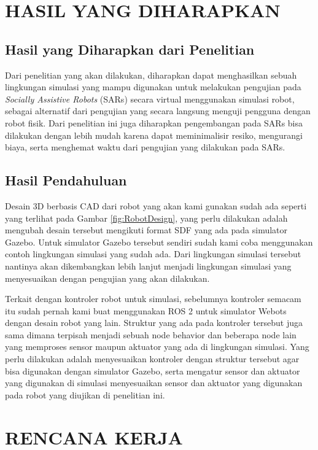 \section{HASIL YANG DIHARAPKAN}

\subsection{Hasil yang Diharapkan dari Penelitian}

Dari penelitian yang akan dilakukan, diharapkan dapat menghasilkan sebuah lingkungan simulasi yang mampu digunakan untuk melakukan pengujian pada \emph{Socially Assistive Robots} (SARs) secara virtual menggunakan simulasi robot, sebagai alternatif dari pengujian yang secara langsung menguji pengguna dengan robot fisik.
Dari penelitian ini juga diharapkan pengembangan pada SARs bisa dilakukan dengan lebih mudah karena dapat meminimalisir resiko, mengurangi biaya, serta menghemat waktu dari pengujian yang dilakukan pada SARs.

\subsection{Hasil Pendahuluan}

Desain 3D berbasis CAD dari robot yang akan kami gunakan sudah ada seperti yang terlihat pada Gambar \ref{fig:RobotDesign}, yang perlu dilakukan adalah mengubah desain tersebut mengikuti format SDF yang ada pada simulator Gazebo.
Untuk simulator Gazebo tersebut sendiri sudah kami coba menggunakan contoh lingkungan simulasi yang sudah ada.
Dari lingkungan simulasi tersebut nantinya akan dikembangkan lebih lanjut menjadi lingkungan simulasi yang menyesuaikan dengan pengujian yang akan dilakukan.

Terkait dengan kontroler robot untuk simulasi, sebelumnya kontroler semacam itu sudah pernah kami buat menggunakan ROS 2 untuk simulator Webots dengan desain robot yang lain.
Struktur yang ada pada kontroler tersebut juga sama dimana terpisah menjadi sebuah node behavior dan beberapa node lain yang memproses sensor maupun aktuator yang ada di lingkungan simulasi.
Yang perlu dilakukan adalah menyesuaikan kontroler dengan struktur tersebut agar bisa digunakan dengan simulator Gazebo, serta mengatur sensor dan aktuator yang digunakan di simulasi menyesuaikan sensor dan aktuator yang digunakan pada robot yang diujikan di penelitian ini.

\section{RENCANA KERJA}

